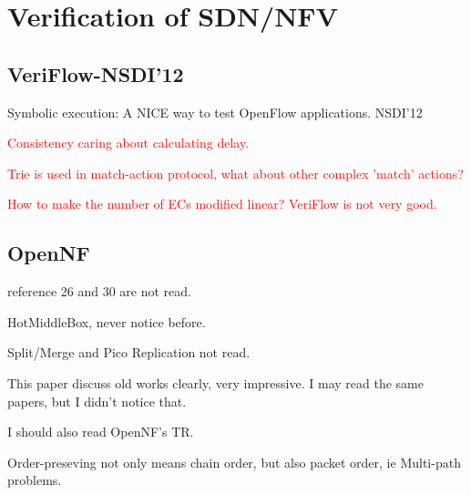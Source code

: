 %
%
%

\chapter{Verification of SDN/NFV}
\label{intro} %


\section{VeriFlow-NSDI'12}
\label{sec:1}

Symbolic execution: A NICE way to test OpenFlow applications. NSDI'12

\textcolor{red}{Consistency caring about calculating delay.}

\textcolor{red}{Trie is used in match-action protocol, what about other complex 'match' actions?}

\textcolor{red}{How to make the number of ECs modified linear? VeriFlow is not very good.}


\section{OpenNF}
\label{sec:2}

reference 26 and 30 are not read.

HotMiddleBox, never notice before.

Split/Merge and Pico Replication not read.

This paper discuss old works clearly, very impressive. I may read the same papers, but I didn't notice that.

I should also read OpenNF's TR.

Order-preseving not only means chain order, but also packet order, ie Multi-path problems.

 